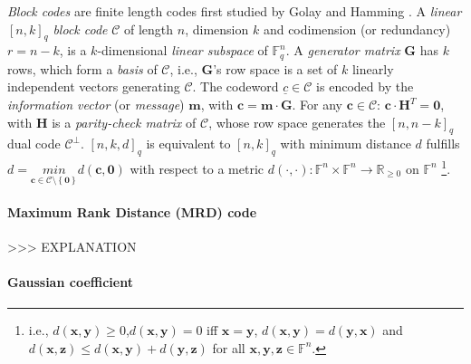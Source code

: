 \textit{Block codes} are finite length codes first studied by Golay
\cite{Golay:1949} and Hamming \cite{Hamming:1950}. A \textit{linear}
$\left[n,k\right]_{q}$ \textit{block code} $\ensuremath{\mathcal{C}}$
of length $n$, dimension $k$ and codimension (or redundancy) $r=n-k$,
is a $k$-dimensional \textit{linear subspace} of $\ensuremath{\mathbb{F}}_{q}^{n}$.
A \textit{generator matrix} $\boldsymbol{G}$ has $k$ rows, which
form a \textit{basis} of $\ensuremath{\mathcal{C}}$, i.e., $\boldsymbol{G}$'s
row space is a set of $k$ linearly independent vectors generating
$\ensuremath{\mathcal{C}}$. The codeword $\underline{c}\in\ensuremath{\mathcal{C}}$
is encoded by the \textit{information vector} (or \textit{message})
$\boldsymbol{m}$, with $\boldsymbol{c}=\boldsymbol{m}\cdot\boldsymbol{G}$.
For any $\boldsymbol{c}\in\ensuremath{\mathcal{C}}$: $\boldsymbol{c}\cdot\boldsymbol{H}^{T}=\boldsymbol{0}$,
with $\boldsymbol{H}$ is a \textit{parity-check matrix} of $\ensuremath{\mathcal{C}}$,
whose row space generates the $\left[n,n-k\right]_{q}$ dual code
$\ensuremath{\mathcal{C}}^{\perp}$. $\left[n,k,d\right]_{q}$ is
equivalent to $\left[n,k\right]_{q}$ with minimum distance $d$ fulfills
$d=\underset{\boldsymbol{c}\in\ensuremath{\mathcal{C}\setminus\left\{ \boldsymbol{0}\right\} }}{min}d\left(\boldsymbol{c},\boldsymbol{0}\right)$
with respect to a metric $d\left(\cdot,\cdot\right):\ensuremath{\mathbb{F}}^{n}\times\ensuremath{\mathbb{F}}^{n}\rightarrow\mathbb{R}_{\geq0}$
on $\ensuremath{\mathbb{F}}^{n}$ \footnote{i.e., $d\left(\boldsymbol{x},\boldsymbol{y}\right)\geq0$,$d\left(\boldsymbol{x},\boldsymbol{y}\right)=0$
iff $\boldsymbol{x}=\boldsymbol{y}$, $d\left(\boldsymbol{x},\boldsymbol{y}\right)=d\left(\boldsymbol{y},\boldsymbol{x}\right)$
and $d\left(\boldsymbol{x},\boldsymbol{z}\right)\leq d\left(\boldsymbol{x},\boldsymbol{y}\right)+d\left(\boldsymbol{y},\boldsymbol{z}\right)$
for all $\boldsymbol{x},\boldsymbol{y},\boldsymbol{z}\in\ensuremath{\mathbb{F}}^{n}$.}.

\paragraph{Maximum Rank Distance (MRD) code}

>\textcompwordmark >\textcompwordmark > EXPLANATION

\paragraph{Gaussian coefficient}

